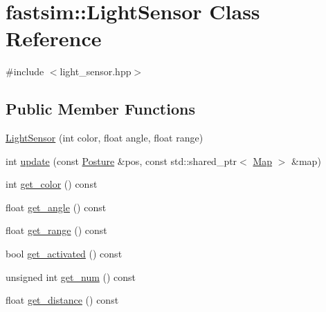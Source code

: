 \hypertarget{classfastsim_1_1_light_sensor}{}\section{fastsim\+:\+:Light\+Sensor Class Reference}
\label{classfastsim_1_1_light_sensor}


{\ttfamily \#include $<$light\+\_\+sensor.\+hpp$>$}

\subsection*{Public Member Functions}
\begin{DoxyCompactItemize}
\item 
\hyperlink{classfastsim_1_1_light_sensor_a2a4af7dba6be2b8b3a201cabfafab07d}{Light\+Sensor} (int color, float angle, float range)
\item 
int \hyperlink{classfastsim_1_1_light_sensor_a1f05e21f50c11bab53335c209ba44c70}{update} (const \hyperlink{classfastsim_1_1_posture}{Posture} \&pos, const std\+::shared\+\_\+ptr$<$ \hyperlink{classfastsim_1_1_map}{Map} $>$ \&map)
\item 
int \hyperlink{classfastsim_1_1_light_sensor_aaa1b85c90b9c5bc8951fe895ea716b62}{get\+\_\+color} () const 
\item 
float \hyperlink{classfastsim_1_1_light_sensor_a392440c3ae83f765236e5179e2199750}{get\+\_\+angle} () const 
\item 
float \hyperlink{classfastsim_1_1_light_sensor_a2449a8ca868b3e3598157384f78cb39e}{get\+\_\+range} () const 
\item 
bool \hyperlink{classfastsim_1_1_light_sensor_a2651bd4d31a560448982c0efe63bc688}{get\+\_\+activated} () const 
\item 
unsigned int \hyperlink{classfastsim_1_1_light_sensor_aec7bb3350eebc21ed7f3ef55e162ef2e}{get\+\_\+num} () const 
\item 
float \hyperlink{classfastsim_1_1_light_sensor_aa09ddd471c19d090a5490713ff90b8ce}{get\+\_\+distance} () const 
\end{DoxyCompactItemize}
